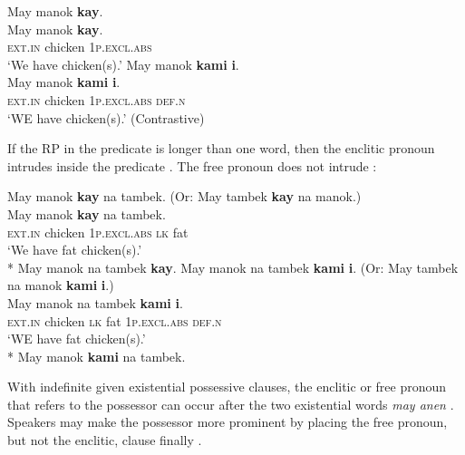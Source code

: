 \ea
    \ea
    \label{ex:wehavechickens-a}
    May  manok  \textbf{kay}. \\\smallskip
\gll May  manok  \textbf{kay}. \\
    \textsc{ext.in}  chicken  1\textsc{p.excl.abs} \\
    \glt \textsc{} ‘We have chicken(s).’
    \ex
    \label{ex:wehavechickens-b}
    May manok \textbf{kami} \textbf{i}. \\\smallskip
\gll May manok \textbf{kami} \textbf{i}. \\
    \textsc{ext.in}  chicken  1\textsc{p.excl.abs} \textsc{def.n} \\    
    \glt ‘WE have chicken(s).’ (Contrastive)
    \z
\z

If the RP in the predicate is longer than one word, then the enclitic pronoun intrudes inside the predicate .  The free pronoun does not intrude :
 
\ea
    \ea
    \label{ex:wehavefatchickens-a}
    May manok \textbf{kay} na tambek. (Or: May tambek \textbf{kay} na manok.) \\\smallskip
\gll May manok \textbf{kay} na tambek. \\
    \textsc{ext.in}  chicken  1\textsc{p.excl.abs} \textsc{lk} fat \\
    \glt ‘We have fat chicken(s).’ \\\smallskip
    *{ }May manok na tambek \textbf{kay}.
\ex 
    \label{ex:wehavefatchickens-b}
    May manok na tambek \textbf{kami} \textbf{i}. (Or: May tambek na manok \textbf{kami} \textbf{i}.) \\\smallskip
\gll May manok na tambek \textbf{kami} \textbf{i}. \\
    \textsc{ext.in}  chicken  \textsc{lk} fat 1\textsc{p.excl.abs} \textsc{def.n} \\    
    \glt ‘WE have fat chicken(s).’ \\\smallskip
    *{ }May manok \textbf{kami} na tambek.
    \z
\z

With indefinite given existential possessive clauses, the enclitic or free pronoun that refers to the possessor can occur after the two existential words \textit{may anen} . Speakers may make the possessor more prominent by placing the free pronoun, but not the enclitic, clause finally . 

